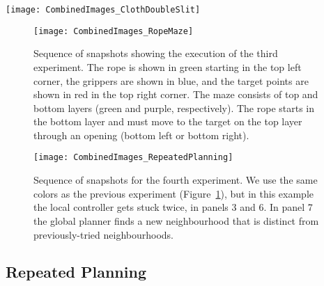 \begin{figure*}[ht]
    \centering
    \texttt{[image: CombinedImages\_ClothDoubleSlit]}
    \vspace{-0.2in}
    \caption{Sequence of snapshots showing the execution of the second experiment. We use the same colors as the previous experiment (Figure~\ref{fig:cloth_single_pole}), but in this example instead of detecting future overstretch in panel (2), we detect that the system is stuck in a bad local minimum and unable to make progress.}
    \label{fig:cloth_double_slit}
\end{figure*}


\begin{figure}[ht]
    \centering
    \texttt{[image: CombinedImages\_RopeMaze]}
    \vspace{-2in}
    \caption{Sequence of snapshots showing the execution of the third experiment. The rope is shown in green starting in the top left corner, the grippers are shown in blue, and the target points are shown in red in the top right corner. The maze consists of top and bottom layers (green and purple, respectively). The rope starts in the bottom layer and must move to the target on the top layer through an opening (bottom left or bottom right).}
    \label{fig:rope_maze}
\end{figure}

\begin{figure}[ht]
    \centering
    \texttt{[image: CombinedImages\_RepeatedPlanning]}
    \vspace{-2in}
    \caption{Sequence of snapshots for the fourth experiment. We use the same colors as the previous experiment (Figure~\ref{fig:rope_maze}), but in this example the local controller gets stuck twice, in panels 3 and 6. In panel 7 the global planner finds a new neighbourhood that is distinct from previously-tried neighbourhoods.}
    \label{fig:repeated_planning}
\end{figure}





\subsection{Repeated Planning}
\label{sec:repeated_rope_maze}

